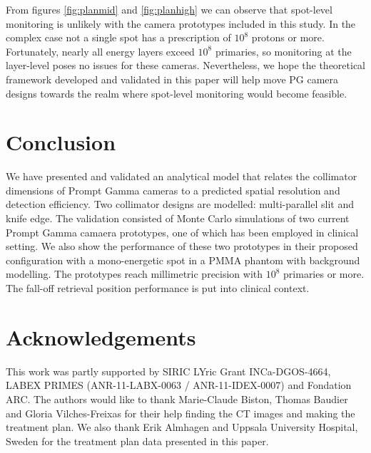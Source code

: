 \documentclass[a4paper,english,12pt]{article}
\begin{document}
From figures \ref{fig:planmid} and \ref{fig:planhigh} we can observe that spot-level monitoring is unlikely with the camera prototypes included in this study. In the complex case not a single spot has a prescription of $10^8$ protons or more. Fortunately, nearly all energy layers exceed $10^8$ primaries, so monitoring at the layer-level poses no issues for these cameras. Nevertheless, we hope the theoretical framework developed and validated in this paper will help move PG camera designs towards the realm where spot-level monitoring would become feasible.

\section{Conclusion}

We have presented and validated an analytical model that relates the collimator dimensions of Prompt Gamma cameras to a predicted spatial resolution and detection efficiency. Two collimator designs are modelled: multi-parallel slit and knife edge. The validation consisted of Monte Carlo simulations of two current Prompt Gamma camaera prototypes, one of which has been employed in clinical setting. We also show the performance of these two prototypes in their proposed configuration with a mono-energetic spot in a PMMA phantom with background modelling. The prototypes reach millimetric precision with $10^8$ primaries or more. The fall-off retrieval position performance is put into clinical context.

\section{Acknowledgements}

This work was partly supported by SIRIC LYric Grant INCa-DGOS-4664, LABEX PRIMES (ANR-11-LABX-0063 / ANR-11-IDEX-0007) and Fondation ARC. The authors would like to thank Marie-Claude Biston, Thomas Baudier and Gloria Vilches-Freixas for their help finding the CT images and making the treatment plan. We also thank Erik Almhagen and Uppsala University Hospital, Sweden for the treatment plan data presented in this paper.

\newpage

\appendix
% 
\end{document}
